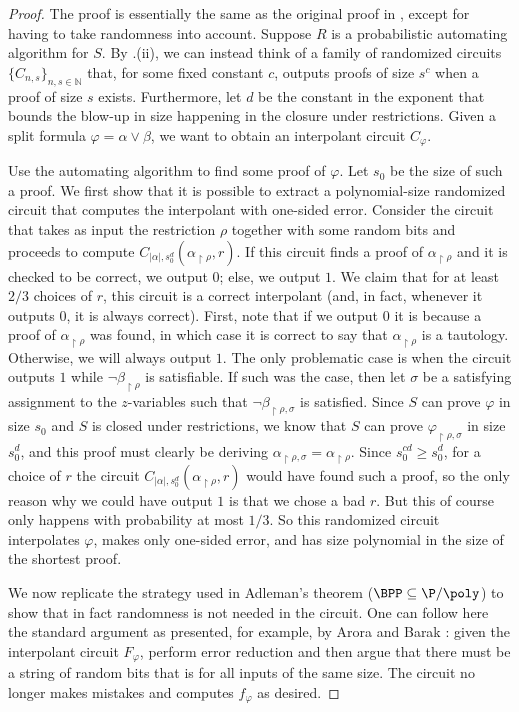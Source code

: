 \documentclass[11pt]{article}
\theoremstyle{definition}
\theoremstyle{plain}
\theoremstyle{remark}
\newcommand{\bN}{\mathbb{N}}
\begin{document}
\begin{proof}
    The proof is essentially the same as the original proof in \cite{BPR1997}, except for having to take randomness into account. Suppose $R$ is a probabilistic automating algorithm for $S$. By .(ii), we can instead think of a family of randomized circuits $\{C_{n, s}\}_{n, s\in \bN}$ that, for some fixed constant $c$, outputs proofs of size $s^c$ when a proof of size $s$ exists. Furthermore, let $d$ be the constant in the exponent that bounds the blow-up in size happening in the closure under restrictions. Given a split formula $\varphi = \alpha \lor \beta$, we want to obtain an interpolant circuit $C_\varphi$.

    Use the automating algorithm to find some proof of $\varphi$. Let $s_0$ be the size of such a proof. We first show that it is possible to extract a polynomial-size randomized circuit that computes the interpolant with one-sided error.
    Consider the circuit that takes as input the restriction $\rho$ together with some random bits and proceeds to compute $C_{|\alpha|, s_0^d}(\alpha_{\restriction \rho}, r)$. If this circuit finds a proof of $\alpha_{\restriction \rho}$ and it is checked to be correct, we output $0$; else, we output $1$. We claim that for at least $2/3$ choices of $r$, this circuit is a correct interpolant (and, in fact, whenever it outputs $0$, it is always correct). First, note that if we output $0$ it is because a proof of $\alpha_{\restriction \rho}$ was found, in which case it is correct to say that $\alpha_{\restriction \rho}$ is a tautology. Otherwise, we will always output $1$. The only problematic case is when the circuit outputs $1$ while $\neg \beta_{\restriction \rho}$ is satisfiable. If such was the case, then let $\sigma$ be a satisfying assignment to the $z$-variables such that $\neg \beta_{\restriction \rho, \sigma}$ is satisfied. Since $S$ can prove $\varphi$ in size $s_0$ and $S$ is closed under restrictions, we know that $S$ can prove $\varphi_{\restriction \rho, \sigma}$ in size $s_0^{d}$, and this proof must clearly be deriving $\alpha_{\restriction \rho, \sigma} = \alpha_{\restriction \rho}$. Since $s_0^{cd} \geq s_0^d$, for a  choice of $r$ the circuit $C_{|\alpha|, s_0^d}(\alpha_{\restriction \rho}, r)$ would have found such a proof, so the only reason why we could have output $1$ is that we chose a bad $r$. But this of course only happens with probability at most $1/3$. So this randomized circuit interpolates $\varphi$, makes only one-sided error, and has size polynomial in the size of the shortest proof.

    We now replicate the strategy used in Adleman's theorem ($\BPP \subseteq \P/\poly$) to show that in fact randomness is not needed in the circuit. One can follow here the standard argument as presented, for example, by Arora and Barak \cite[Thm. 7.15]{AB09}: given the interpolant circuit $F_\varphi$, perform error reduction and then argue that there must be a string of random bits that is  for all inputs of the same size. The circuit no longer makes mistakes and computes $f_\varphi$ as desired.
\end{proof}
\end{document}
